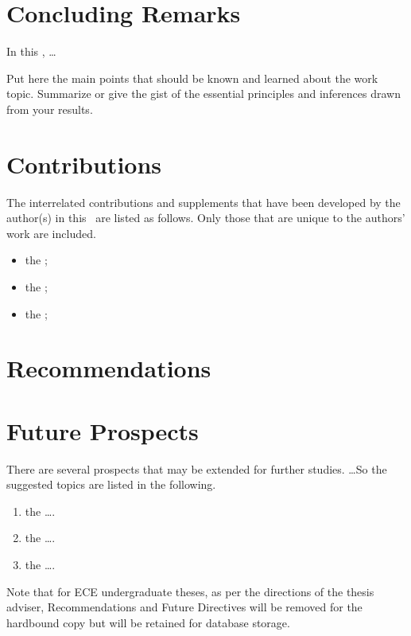 \section{Concluding Remarks}

In this \documentType, \ldots

Put here the main points that should be known and learned about the  work topic. Summarize or give the gist of the essential principles and inferences drawn from your results.

\section{Contributions}

The interrelated  contributions and supplements that have been developed by the author(s) in this \documentType \ are listed as follows.  Only those that are unique to the authors' work are included.

\begin{itemize}
  \item the ; 
	
	\item the ; 
  
  \item the ; 
	
\end{itemize}


\section{Recommendations}

\graytx{\Blindtext}

\section{Future Prospects}

There are several prospects that may be extended for further studies. \ldots So the suggested topics are listed in the following.

\begin{enumerate}
	\item  the \ldots.
	
	\item  the \ldots.
		
	\item  the \ldots.
\end{enumerate}

Note that for ECE undergraduate theses, as per the directions of the thesis adviser, Recommendations and Future Directives will be removed for the hardbound copy but will be retained for database storage.

